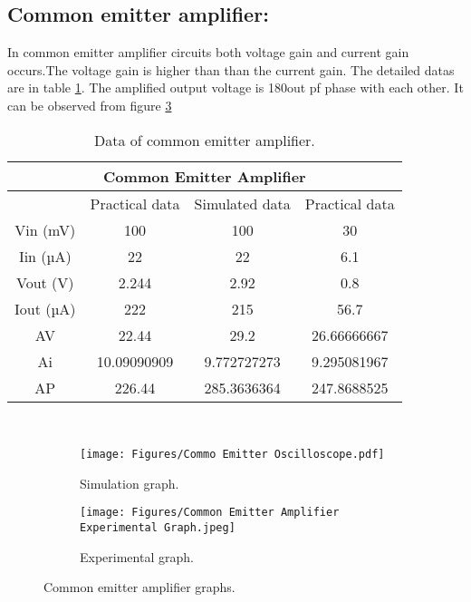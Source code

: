 \documentclass[a4paper, 12pt]{extarticle}
\begin{document}
\subsection{Common emitter amplifier:}
In common emitter amplifier circuits both voltage gain and current gain occurs.The voltage gain is higher than than the current gain. The detailed datas are in table \ref{tab:Datas of common emitter amplifier}. The amplified output voltage is 180\degree out pf phase with each other. It can be observed from figure \ref{fig:Common Emitter Amplifier Graphs.}
\begin{table}[htbp]
  \centering
  \caption{Data of common emitter amplifier.}
    \begin{tabular}{|c|c|c|c|}
    \toprule
    \multicolumn{4}{|c|}{Common Emitter Amplifier} \\
    \midrule
          & Practical data & Simulated data & Practical data \\
    \midrule
    Vin (mV) & 100   & 100   & 30 \\
    \midrule
    Iin (µA) & 22    & 22    & 6.1 \\
    \midrule
    Vout (V) & 2.244 & 2.92  & 0.8 \\
    \midrule
    Iout (µA) & 222   & 215   & 56.7 \\
    \midrule
    AV    & 22.44 & 29.2  & 26.66666667 \\
    \midrule
    Ai    & 10.09090909 & 9.772727273 & 9.295081967 \\
    \midrule
    AP    & 226.44 & 285.3636364 & 247.8688525 \\
    \bottomrule
    \end{tabular}%
  \label{tab:Datas of common emitter amplifier}%
\end{table}%
\\
\begin{figure}[htbp]
    \centering
        \begin{subfigure}[h]{0.48\textwidth}
        \centering
            \texttt{[image: Figures/Commo Emitter Oscilloscope.pdf]}
            \caption{Simulation graph.}
            \label{fig:Common Emitter Amplifier Simulation Graph}
        \end{subfigure}
        \hfill
        \begin{subfigure}[h]{0.48\textwidth}
        \centering
            \texttt{[image: Figures/Common Emitter Amplifier Experimental Graph.jpeg]}
            \caption{Experimental graph.}
            \label{fig:Common Emitter Amplifier Experimental Graph}
        \end{subfigure}
        \caption{Common emitter amplifier graphs.}
        \label{fig:Common Emitter Amplifier Graphs.}
\end{figure}
\end{document}
